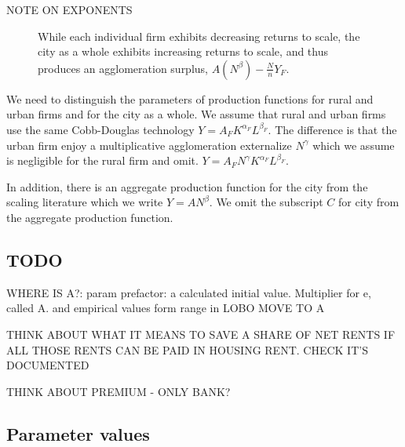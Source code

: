 NOTE ON EXPONENTS

\begin{figure}[htb]
    \centering

    \caption{While each individual firm exhibits decreasing returns to scale, the city as a whole exhibits increasing returns to scale, and thus produces an agglomeration surplus, $A(N^\beta)-\frac{N}{n}Y_F$.}
    \label{fig:Agglomeration-surplus}
\end{figure}

We need to distinguish the parameters of production functions for rural and urban firms and for the city as a whole. We assume that  rural and  urban firms use the same Cobb-Douglas technology $Y=A_FK^{\alpha_F}L^{\beta_F}$. The difference is that the urban firm enjoy a  multiplicative agglomeration externalize $N^\gamma$ which we assume is negligible for the rural firm and omit. $Y=A_FN^\gamma  K^{\alpha_F}L^{\beta_F}$.

In addition, there is an aggregate production function for the city from the scaling literature which we write $Y=AN^\beta$. We omit the subscript $C$ for city from  the aggregate production function.    

\subsection{TODO}


WHERE IS A?: param prefactor:  a  calculated initial value. Multiplier for e, called A. and empirical values form range in LOBO MOVE TO A

THINK ABOUT WHAT IT MEANS TO SAVE A SHARE OF NET RENTS IF ALL THOSE RENTS CAN BE PAID IN HOUSING RENT. CHECK IT'S DOCUMENTED


THINK ABOUT PREMIUM - ONLY BANK?

\subsection{Parameter values}\label{sec-param-values}

